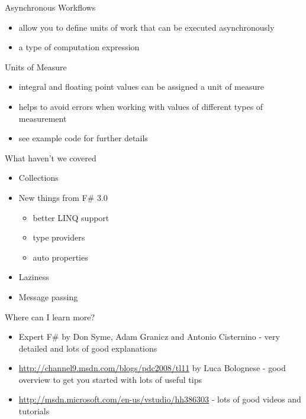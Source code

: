 \documentclass[landscape]{slides}
\begin{document}
\begin{slide}{Asynchronous Workflows}
\begin{itemize}
\item allow you to define units of work that can be executed asynchronously
\item a type of computation expression
\end{itemize}
\end{slide}

\begin{slide}{Units of Measure}
\begin{itemize}
\item integral and floating point values can be assigned a unit of measure
\item helps to avoid errors when working with values of different types of measurement
\item see example code for further details
\end{itemize}
\end{slide}

\begin{slide}{What haven't we covered}
\begin{itemize}
\item Collections
\item New things from F\# 3.0
\begin{itemize}
\item better LINQ support
\item type providers
\item auto properties
\end{itemize}
\item Laziness
\item Message passing
\end{itemize}
\end{slide}

\begin{slide}{Where can I learn more?}
\begin{itemize}
\item Expert F\# by Don Syme, Adam Granicz and Antonio Cisternino - very detailed and lots of good explanations
\item \href{http://channel9.msdn.com/blogs/pdc2008/tl11}{http://channel9.msdn.com/blogs/pdc2008/tl11} by Luca Bolognese - good overview to get you started with lots of useful tips
\item \href{http://msdn.microsoft.com/en-us/vstudio/hh386303}{http://msdn.microsoft.com/en-us/vstudio/hh386303} - lots of good videos and tutorials
\end{itemize}
\end{slide}
\end{document}
